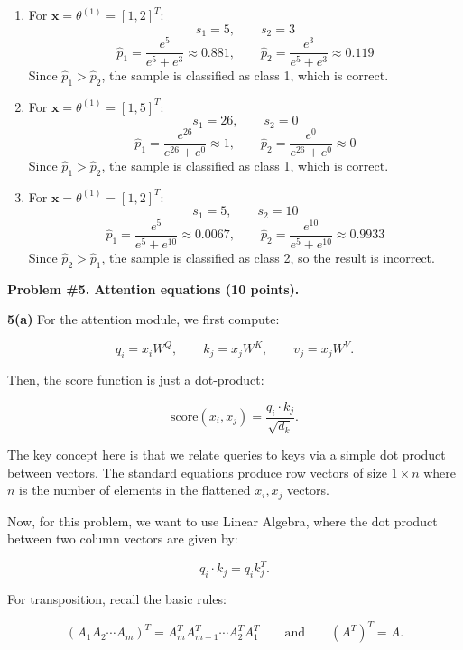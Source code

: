 \documentclass[12pt]{article}
\begin{document}
	\begin{enumerate}[itemsep=4pt]
		
		\item[(i)] For \(\mathbf{x}=\theta^{(1)}=[1,2]^T\):
		\[
		s_1=5,\qquad s_2=3
		\]
		\[
		\hat{p}_1=\frac{e^5}{e^5+e^3}\approx 0.881,
		\qquad
		\hat{p}_2=\frac{e^3}{e^5+e^3}\approx 0.119
		\]
		Since \(\hat{p}_1>\hat{p}_2\), the sample is classified as class 1, which is correct.
		
		\item[(ii)] For \(\mathbf{x}=\theta^{(1)}=[1,5]^T\):
		\[
		s_1=26,\qquad s_2=0
		\]
		\[
		\hat{p}_1=\frac{e^{26}}{e^{26}+e^0}\approx 1,
		\qquad
		\hat{p}_2=\frac{e^0}{e^{26}+e^0}\approx 0
		\]
		Since \(\hat{p}_1>\hat{p}_2\), the sample is classified as class 1, which is correct.
		
		\item[(iii)] For \(\mathbf{x}=\theta^{(1)}=[1,2]^T\):
		\[
		s_1=5,\qquad s_2=10
		\]
		\[
		\hat{p}_1=\frac{e^5}{e^5+e^{10}}\approx 0.0067,
		\qquad
		\hat{p}_2=\frac{e^{10}}{e^5+e^{10}}\approx 0.9933
		\]
		Since \(\hat{p}_2>\hat{p}_1\), the sample is classified as class 2, so the result is incorrect.
		
	\end{enumerate}
	
	\newpage
	
	\noindent\textbf{Problem \#5. Attention equations (10 points).}
	
	\noindent\textbf{5(a)} For the attention module, we first compute:
	
	\[
	q_i=x_iW^Q,
	\qquad
	k_j=x_jW^K,
	\qquad
	v_j=x_jW^V.
	\]
	
	Then, the score function is just a dot-product:
	
	\[
	\mathrm{score}(x_i,x_j)
	=
	\frac{q_i\cdot k_j}{\sqrt{d_k}}.
	\]
	
	The key concept here is that we relate queries to keys via a simple dot product between vectors. The standard equations produce row vectors of size \(1\times n\) where \(n\) is the number of elements in the flattened \(x_i,x_j\) vectors.
	
	Now, for this problem, we want to use Linear Algebra, where the dot product between two column vectors are given by:
	
	\[
	q_i\cdot k_j
	=
	q_i k_j^T.
	\]
	
	For transposition, recall the basic rules:
	
	\[
	(A_1A_2\cdots A_m)^T
	=
	A_m^TA_{m-1}^T\cdots A_2^TA_1^T
	\qquad
	\mathrm{and}
	\qquad
	(A^T)^T=A.
	\]
	
\end{document}
